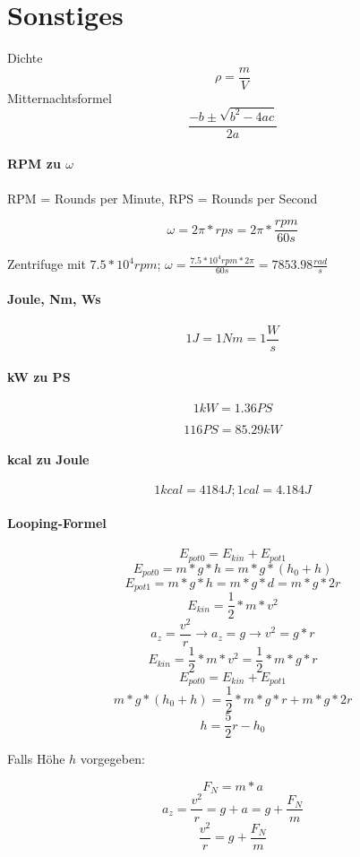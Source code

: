 \section{Sonstiges}

Dichte $$\rho = \frac{m}{V}$$
Mitternachtsformel $$\frac{-b \pm \sqrt{b^{2}-4ac}}{2a}$$

\paragraph{RPM zu $\omega$}

RPM = Rounds per Minute, RPS = Rounds per Second

$$\omega = 2\pi * rps = 2\pi * \frac{rpm}{60s}$$

Zentrifuge mit $7.5*10^4 rpm$; $\omega = \frac{7.5*10^4 rpm * 2\pi}{60s} = 7853.98 \frac{rad}{s}$

\paragraph{Joule, Nm, Ws}

$$1 J = 1 Nm = 1 \frac{W}{s}$$

\paragraph{kW zu PS}

$$1kW = 1.36PS$$

$$116 PS = 85.29kW$$

\paragraph{kcal zu Joule}

$$1 kcal = 4184 J; 1 cal = 4.184J$$

\paragraph{Looping-Formel}

$$E_{pot0} = E_{kin} + E_{pot1}$$
$$E_{pot0} = m*g*h = m*g*(h_0 + h)$$
$$E_{pot1} = m*g*h = m*g*d = m*g*2r$$
$$E_{kin} = \frac{1}{2}*m*v^2$$
$$a_z = \frac{v^2}{r} \rightarrow a_z = g \rightarrow v^2 = g*r$$
$$E_{kin} = \frac{1}{2}*m*v^2 = \frac{1}{2}*m*g*r$$
$$E_{pot0} = E_{kin} + E_{pot1}$$
$$m*g*(h_0+h) = \frac{1}{2}*m*g*r + m*g*2r$$
$$h = \frac{5}{2}r-h_0$$

Falls Höhe $h$ vorgegeben:

$$F_N = m*a$$
$$a_z = \frac{v^2}{r} = g+a = g+\frac{F_N}{m}$$
$$\frac{v^2}{r} = g+\frac{F_N}{m}$$

